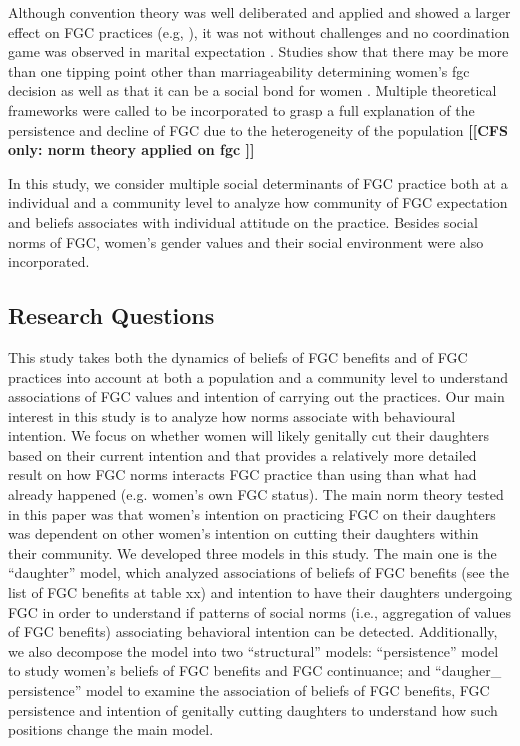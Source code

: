 \documentclass[12pt,]{article}
\newcommand{\comment}[1]{\textbf{[[#1]]}}
\newcommand{\cfonly}[1]{\comment{CFS only: #1}}
\begin{document}
Although convention theory was well deliberated and applied and showed a larger effect on FGC practices (e.g, \cite{BoylMcMo02, BoylCorl10, FreyJohn07, FrieMahm13, Hayf05, KandMwek09, Mack96, Mack06, ReigGonz14, YirgKass12}),  it was not without challenges and no coordination game was observed in marital expectation \cite{EffeVogt15}.  Studies show that there may be more than one tipping point other than marriageability determining women’s fgc decision \cite{AlcaGonz13, BellNova15, EffeVogt15, Hayf05, Mack09, PashPonn16, Rima08, ShelWand11, more?} as well as that it can be a social bond for women \cite{Mack00, DuncWand11}.  Multiple theoretical frameworks were called to be incorporated to grasp a full explanation of the persistence and decline of FGC due to the heterogeneity of the population \cite{EffeVogt15, ModrLiu13} \cfonly {norm theory \cite{Ajze91, Ajze02, Bicc10, BiccMari15, Mack96, Mack00, MackLeJe08, RimaLapi15, Youn11} applied on fgc \icte{CislHeis18, EffeVogt15, Harf06, PashPonn16, ShelHern06,}}

In this study, we consider multiple social determinants of FGC practice both at a individual and a community level to analyze how community of FGC expectation and beliefs associates with individual attitude on the practice.  Besides social norms of FGC, women’s gender values and their social environment were also incorporated.


\subsection{Research Questions}\label{research-questions}

This study takes both the dynamics of beliefs of FGC benefits and of FGC practices into account at both a population and a community level to understand associations of FGC values and intention of carrying out the practices.  Our main interest in this study is to analyze how norms associate with behavioural intention.  We focus on whether women will likely genitally cut their daughters based on their current intention and that provides a relatively more detailed result on how FGC norms interacts FGC practice than using than what had already happened (e.g. women’s own FGC status).  The main norm theory tested in this paper was that women’s intention on practicing FGC on their daughters was dependent on other women’s intention on cutting their daughters within their community.  We developed three models in this study.  The main one is the “daughter” model, which analyzed associations of beliefs of FGC benefits (see the list of FGC benefits at table xx) and intention to have their daughters undergoing FGC in order to understand if patterns of social norms (i.e., aggregation of values of FGC benefits) associating behavioral intention can be detected.  Additionally, we also decompose the model into two “structural” models:  “persistence” model to study women’s beliefs of FGC benefits and FGC continuance; and “daugher_ persistence” model to examine the association of beliefs of FGC benefits, FGC persistence and intention of genitally cutting daughters to understand how such positions change the main model.
\end{document}
